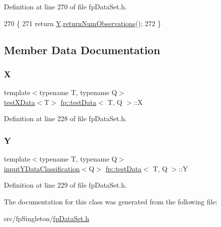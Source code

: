 Definition at line 270 of file fp\+Data\+Set.\+h.


\begin{DoxyCode}
270                                           \{
271             \textcolor{keywordflow}{return} \hyperlink{classfp_1_1testData_a9421a63841491860ddeeb1f7fa0d4219}{Y}.\hyperlink{classfp_1_1inputYData_a6f6c2742745fd59daafef4e51d76400a}{returnNumObservations}();
272         \}
\end{DoxyCode}


\subsection{Member Data Documentation}
\mbox{\label{classfp_1_1testData_ad85120d23de2f6c10d6e9455e5f5adb9}} 
\subsubsection{\texorpdfstring{X}{X}}
{\footnotesize\ttfamily template$<$typename T, typename Q$>$ \\
\hyperlink{classfp_1_1testXData}{test\+X\+Data}$<$T$>$ \hyperlink{classfp_1_1testData}{fp\+::test\+Data}$<$ T, Q $>$\+::X\hspace{0.3cm}{\ttfamily [private]}}



Definition at line 228 of file fp\+Data\+Set.\+h.

\mbox{\label{classfp_1_1testData_a9421a63841491860ddeeb1f7fa0d4219}} 
\subsubsection{\texorpdfstring{Y}{Y}}
{\footnotesize\ttfamily template$<$typename T, typename Q$>$ \\
\hyperlink{classfp_1_1inputYDataClassification}{input\+Y\+Data\+Classification}$<$Q$>$ \hyperlink{classfp_1_1testData}{fp\+::test\+Data}$<$ T, Q $>$\+::Y\hspace{0.3cm}{\ttfamily [private]}}



Definition at line 229 of file fp\+Data\+Set.\+h.



The documentation for this class was generated from the following file\+:\begin{DoxyCompactItemize}
\item 
src/fp\+Singleton/\hyperlink{fpDataSet_8h}{fp\+Data\+Set.\+h}\end{DoxyCompactItemize}
